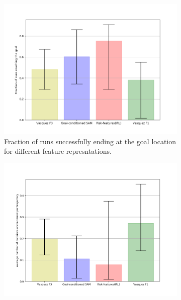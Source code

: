\begin{figure}[htbp]
	\begin{subfigure}[t]{.5\columnwidth}
	\centering
	\includegraphics[width=\columnwidth]{plots/zara02_inter_irl_adjusted_speed/goal_reached_zara02_adjusted_inter_irl.png}
	\caption{Fraction of runs successfully ending at the goal location for different feature represntations.}
	\label{fig:inter_method-goal_reached-zara02}
	\end{subfigure}%
	\begin{subfigure}[t]{.5\columnwidth}
		\centering
		\includegraphics[width=\columnwidth]{plots/zara02_inter_irl_adjusted_speed/count_collisions_zara02_adjusted_inter_irl.png}
		\label{fig:inter_method-count_collisions-zara02}
	\end{subfigure}%
	\label{fig:inter_method-classic_navigation_metrics-zara02}
\end{figure}

